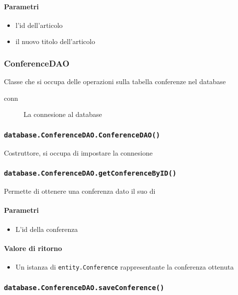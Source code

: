 \paragraph{Parametri}
\begin{itemize}
\item l'id dell'articolo              
\item il nuovo titolo dell'articolo
\end{itemize}

\subsubsection{ConferenceDAO}
Classe che si occupa delle operazioni sulla tabella conferenze nel database
\begin{description}
\item[conn] La connesione al database
\end{description}

\subsubsection{\texttt{database.ConferenceDAO.ConferenceDAO()}}
Costruttore, si occupa di impostare la connesione

\subsubsection{\texttt{database.ConferenceDAO.getConferenceByID()}}
Permette di ottenere una conferenza dato il suo di
\paragraph{Parametri}
\begin{itemize}
\item L'id della conferenza
\end{itemize}
\paragraph{Valore di ritorno}
\begin{itemize}
\item Un istanza di \texttt{entity.Conference} rappresentante la conferenza ottenuta
\end{itemize}

\subsubsection{\texttt{database.ConferenceDAO.saveConference()}}
